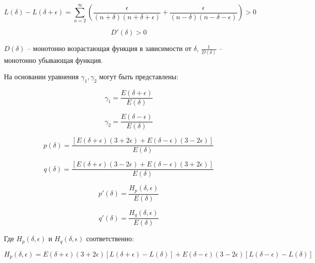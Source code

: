 \begin{equation}
\label{eq:equation77}
L(\delta) - L(\delta + \epsilon) = \sum_{n=2}^{\infty} \left(  \frac{\epsilon}{(n + \delta)(n + \delta + \epsilon)} + \frac{\epsilon}{(n - \delta)(n - \delta - \epsilon)} \right) > 0
\end{equation}

\begin{equation}
\label{eq:equation78}
D'(\delta) > 0 
\end{equation}

$D(\delta)$ -- монотонно возрастающая функция в зависимости от $\delta$, $\frac{1}{D(\delta)}$ -- монотонно убывающая функция. 

На основании уравнения  $\gamma_1, \gamma_2$ могут быть представлены:

\begin{equation}
\label{eq:equation79}
\gamma_1 = \frac{E(\delta + \epsilon)}{E(\delta)} 
\end{equation}

\begin{equation}
\label{eq:equation80}
\gamma_2 = \frac{E(\delta - \epsilon)}{E(\delta)} 
\end{equation}

\begin{equation}
\label{eq:equation81}
p(\delta) = \frac{[E(\delta + \epsilon)(3 + 2 \epsilon) + E(\delta - \epsilon)(3 - 2 \epsilon)]}{E(\delta)}
\end{equation}

\begin{equation}
\label{eq:equation82}
q(\delta) = \frac{[E(\delta + \epsilon)(3 - 2 \epsilon) + E(\delta - \epsilon)(3 + 2 \epsilon)]}{E(\delta)}
\end{equation}

\begin{equation}
\label{eq:equation83}
p'(\delta) = \frac{H_{p}(\delta, \epsilon)}{E(\delta)}
\end{equation}

\begin{equation}
\label{eq:equation84}
q'(\delta) = \frac{H_{q}(\delta, \epsilon)}{E(\delta)}
\end{equation}

Где $H_{p}(\delta, \epsilon)$ и $H_{q}(\delta, \epsilon)$ соответственно:

\begin{equation}
\label{eq:equation85}
H_{p}(\delta, \epsilon) = E(\delta + \epsilon)(3 + 2 \epsilon) [L (\delta + \epsilon) - L(\delta)] + E(\delta - \epsilon)(3 - 2\epsilon) [L(\delta - \epsilon) - L(\delta)]
\end{equation}

